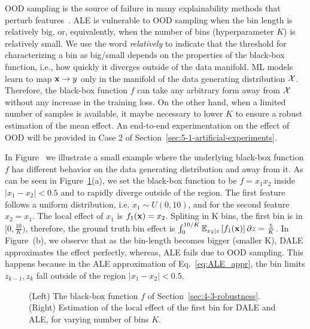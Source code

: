 OOD sampling is the source of failure in many explainability methods
that perturb features~\citep{Hooker2021}. ALE is vulnerable to OOD
sampling when the bin length is relatively big, or, equivalently, when
the number of bins (hyperparameter \(K\)) is relatively small. We use
the word \textit{relatively} to indicate that the threshold for
characterizing a bin as big/small depends on the properties of the
black-box function, i.e., how quickly it diverges outside of the data
manifold. ML models learn to map \( \mathbf{x} \rightarrow y \) only in the
manifold of the data generating distribution \(\mathcal{X}\). Therefore, the
black-box function \(f\) can take any arbitrary form away from \(\mathcal{X}\)
without any increase in the training loss. On the other hand, when a
limited number of samples is available, it maybe necessary to lower
\(K\) to ensure a robust estimation of the mean effect. An end-to-end
experimentation on the effect of OOD will be provided in Case 2 of
Section~\ref{sec:5-1-artificial-experiments}.

In Figure~ we illustrate a small
example where the underlying black-box function \(f\) has different
behavior on the data generating distribution and away from it. As can
be seen in Figure~\ref{fig:example-different-bins}(a), we set the
black-box function to be \(f = x_1x_2\) inside \(|x_1-x_2| < 0.5\) and
to rapidly diverge outside of the region. The first feature follows a
uniform distribution, i.e. \(x_1 \sim U(0,10)\), and for the second
feature \(x_2=x_1\). The local effect of \(x_1\) is
\(f_1(\mathbf{x}) = x_2 \). Spliting in K bins, the first bin is in
\( [0, \frac{10}{K} ) \), therefore, the ground truth bin effect is
\(\int_0^{10/K} \mathbb{E}_{x_2|z}\left[f_1(\mathbf{x})\right]\partial z =
\frac{5}{K}\). In Figure~(b), we
observe that as the bin-length becomes bigger (smaller K), DALE
approximates the effect perfectly, whereas, ALE fails due to OOD
sampling. This happens because in the ALE approximation of
Eq.~\eqref{eq:ALE_appr}, the bin limits \(z_{k-1}, z_k\) fall outside
of the region \(|x_1-x_2| < 0.5\).





\begin{figure}[h]
  \centering
  \resizebox{.35\columnwidth}{!}{}
  \resizebox{.35\columnwidth}{!}{}
  \caption[Example comparison]{(Left) The black-box function \(f\) of
    Section~\ref{sec:4-3-robustness}. (Right) Estimation of the local
    effect of the first bin for DALE and ALE, for varying number of
    bins \(K\).}
  \label{fig:example-different-bins}
\end{figure}
